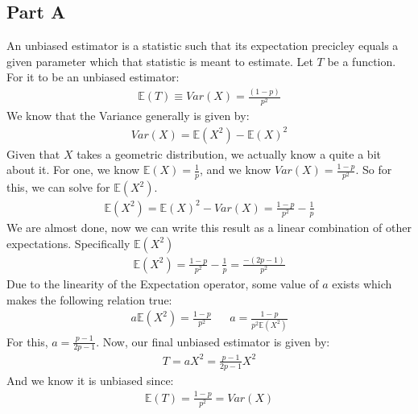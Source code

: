 \documentclass{article}
\begin{document}
\subsection*{Part A}
An unbiased estimator is a statistic such that its expectation precicley equals a given parameter which that statistic is meant to estimate. Let $T$ be a function. For it to be an unbiased estimator:
\begin{align*}
\mathbb{E}(T)\equiv Var(X) =\tfrac{(1-p)}{p^2}
\end{align*}
We know that the Variance generally is given by:
\begin{align*}
Var(X)=\mathbb{E}(X^2)-\mathbb{E}(X)^2
\end{align*}
Given that $X$ takes a geometric distribution, we actually know a quite a bit about it. For one, we know $\mathbb{E}(X)=\frac{1}{p}$, and we know $Var(X) = \frac{1-p}{p^2}$. So for this, we can solve for $\mathbb{E}(X^2)$.
\begin{align*}
\mathbb{E}(X^2) = \mathbb{E}(X)^2-Var(X) = \frac{1-p}{p^2} - \frac{1}{p}
\end{align*}
We are almost done, now we can write this result as a linear combination of other expectations. Specifically $\mathbb{E}(X^2)$
\begin{align*}
\mathbb{E}(X^2) = \frac{1-p}{p^2} - \frac{1}{p} = \frac{-(2p-1)}{p^2}
\end{align*}
Due to the linearity of the Expectation operator, some value of $a$ exists which makes the following relation true:
\begin{align*}
a \mathbb{E}(X^2) = \frac{1-p}{p^2} && a = \frac{1-p}{p^2 \mathbb{E}(X^2)}
\end{align*}
For this, $a=\frac{p-1}{2p-1}$.
Now, our final unbiased estimator is given by:
\begin{align*}
\boxed{T = aX^2 = \frac{p-1}{2p-1}X^2}
\end{align*}
And we know it is unbiased since:
\begin{align*}
\mathbb{E}(T) = \frac{1-p}{p^2} = Var(X)
\end{align*}
\end{document}
